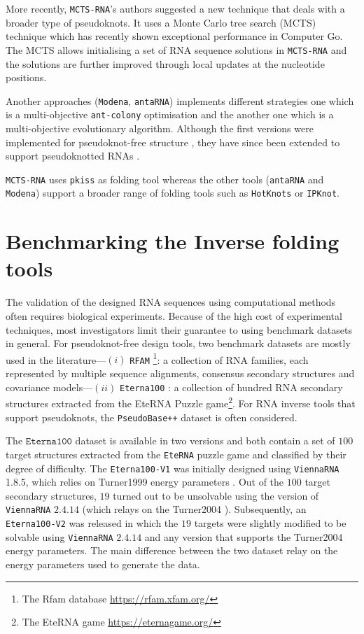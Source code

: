 More recently, \texttt{MCTS-RNA}'s authors suggested a new technique that deals with a broader type of pseudoknots. It uses a Monte Carlo tree search (MCTS) technique which has recently shown exceptional performance in Computer Go. The MCTS allows initialising a set of RNA sequence solutions in \texttt{MCTS-RNA} and the solutions are further improved through local updates at the nucleotide positions.

Another approaches (\texttt{Modena}, \texttt{antaRNA}) implements different strategies one which is a multi-objective \texttt{ant-colony} optimisation and the another one which is a multi-objective evolutionary algorithm.  Although the first versions were implemented for pseudoknot-free structure \cite{taneda2011modena, kleinkauf2015antarna}, they have since been extended to support pseudoknotted RNAs \cite{modena_2012, kleinkauf2015antarna2}. 

\texttt{MCTS-RNA} uses \texttt{pkiss} as folding tool whereas the other tools (\texttt{antaRNA} and \texttt{Modena}) support a broader range of folding tools such as \texttt{HotKnots} or \texttt{IPKnot}. 
 
\section{Benchmarking the Inverse folding tools}
The validation of the designed RNA sequences using computational methods often requires biological experiments. Because of the high cost of experimental techniques, most investigators limit their guarantee to using benchmark datasets \cite{churkin2017design} in general. For pseudoknot-free design tools,  two benchmark datasets are mostly used in the literature---$(i)$ \texttt{RFAM} \footnote{The Rfam database \url{https://rfam.xfam.org/}}: a collection of RNA families, each represented by multiple sequence alignments, consensus secondary structures and covariance models---$(ii)$ \texttt{Eterna100} \cite{anderson2016principles}: a collection of hundred RNA secondary structures extracted from the EteRNA Puzzle game\footnote{The EteRNA game \url{https://eternagame.org/}}. For RNA inverse tools that support pseudoknots, the \texttt{PseudoBase++}\cite{taufer2009pseudobase++} dataset is often considered. 

The \(\texttt{Eterna100}\) dataset \cite{Eterna} is available in two versions and both contain a set of \(100\) target structures extracted from the \texttt{EteRNA} puzzle game and classified by their degree of difficulty. The \texttt{Eterna100-V1} was initially designed using \texttt{ViennaRNA} 1.8.5, which relies on Turner1999 energy parameters \cite{Turn1999}. Out of the $100$ target secondary structures, $19$ turned out to be unsolvable using the version of \texttt{ViennaRNA} $2.4.14$ (which relays on the Turner2004 \cite{mathews2004incorporating}). Subsequently, an \texttt{Eterna100-V2} \cite{Eterna} was released in which the $19$ targets were slightly modified to be solvable using \texttt{ViennaRNA} $2.4.14$ and any version that supports the Turner2004 energy parameters. The main difference between the two dataset relay on the energy parameters used to generate the data.

